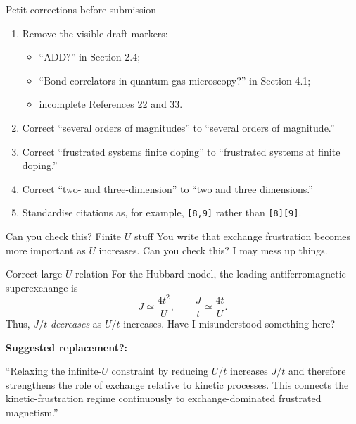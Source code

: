 \documentclass[aspectratio=169,11pt]{beamer}
\begin{document}
\begin{frame}{Petit corrections before submission}
\begin{enumerate}
  \item Remove the visible draft markers:
    \begin{itemize}
      \item ``ADD?'' in Section 2.4;
      \item ``Bond correlators in quantum gas microscopy?'' in Section 4.1;
      \item incomplete References 22 and 33.
    \end{itemize}
  \item Correct ``several orders of magnitudes'' to ``several orders of magnitude.''
  \item Correct ``frustrated systems finite doping'' to ``frustrated systems at finite doping.''
  \item Correct ``two- and three-dimension'' to ``two and three dimensions.''
  \item Standardise citations as, for example, \texttt{[8,9]} rather than \texttt{[8][9]}.
\end{enumerate}
\end{frame}

\begin{frame}{Can you check this? Finite $U$ stuff}
You write  that exchange frustration becomes more important as $U$ increases. Can you check this?  I may mess up things.

\begin{block}{Correct large-$U$ relation}
For the Hubbard model, the leading antiferromagnetic superexchange is
\[
J \simeq \frac{4t^2}{U},
\qquad
\frac{J}{t}\simeq\frac{4t}{U}.
\]
Thus, $J/t$ \emph{decreases} as $U/t$ increases. Have I misunderstood something here?
\end{block}

\textbf{Suggested replacement?:}

``Relaxing the infinite-$U$ constraint by reducing $U/t$ increases $J/t$ and therefore strengthens the role of exchange relative to kinetic processes. This connects the kinetic-frustration regime continuously to exchange-dominated frustrated magnetism.''
\end{frame}
\end{document}
